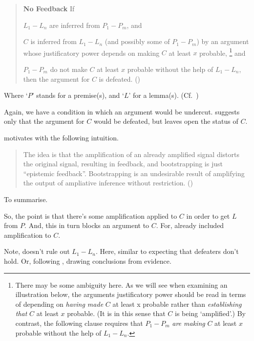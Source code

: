 \begin{note}[No feedback]
  \begin{quote}
    \textbf{No Feedback} If
    \begin{enumerate*}[label=(\roman*)]
    \item\label{W:NF:i} \(L_{1}-L_{n}\) are inferred from \(P_{1}-P_{m}\), and
    \item\label{W:NF:ii} \(C\) is inferred from \(L_{1}-L_{n}\) (and possibly some of \(P_{1}-P_{m}\)) by an argument whose justificatory power depends on making \(C\) at least \(x\) probable,\nolinebreak
      \footnote{
        There may be some ambiguity here.
        As we will see when examining an illustration below, the arguments justificatory power should be read in terms of depending on \emph{having made} \(C\) at least x probable rather than \emph{establishing that} \(C\) at least \(x\) probable.
        (It is in this sense that \(C\) is being `amplified'.)
        By contrast, the following clause requires that \(P_{1}-P_{m}\) \emph{are making} \(C\) at least \(x\) probable without the help of \(L_{1}-L_{n}\).
      }
      and
    \item\label{W:NF:iii} \(P_{1}-P_{m}\) do not make \(C\) at least \(x\) probable without the help of \(L_{1}-L_{n}\), then the argument for \(C\) is defeated.\linebreak
      \mbox{}\hfill\mbox{(\Citeyear[533--534]{Weisberg:2010to})}
    \end{enumerate*}
  \end{quote}
  Where `\(P\)' stands for a premise(s), and `\(L\)' for a lemma(s). (Cf.~\Citeyear[533]{Weisberg:2010to})

  Again, we have a condition in which an argument would be undercut.
  \wnf{} suggests only that the argument for \(C\) would be defeated, but leaves open the status of \(C\).
\end{note}

\begin{note}
  \citeauthor{Weisberg:2010to} motivates with the following intuition.
  \begin{quote}
    The idea is that the amplification of an already amplified signal distorts the original signal, resulting in feedback, and bootstrapping is just ``epistemic feedback''.
    Bootstrapping is an undesirable result of amplifying the output of ampliative inference without restriction.\linebreak
    \mbox{}\hfill\mbox{(\Citeyear[534]{Weisberg:2010to})}
  \end{quote}

  To summarise.
  {
    \color{red}
    So, the point is that there's some amplification applied to \(C\) in order to get \(L\) from \(P\).
    And, this in turn blocks an argument to \(C\).
    For, already included amplification to \(C\).
    
  }
  {
    \color{red}
    Note, doesn't rule out \(L_{1}-L_{n}\).
    Here, similar to expecting that defeaters don't hold.
    Or, following \citeauthor{Weisberg:2010to}, drawing conclusions from evidence.
  }
\end{note}

